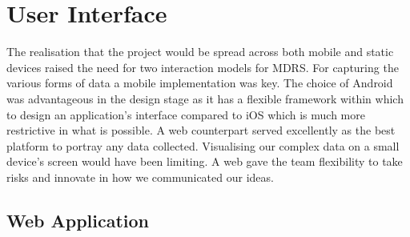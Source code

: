 \documentclass{l3proj}
\begin{document}
\section{User Interface} The realisation that the project would be spread across
both mobile and static devices raised the need for two interaction models for
MDRS. For capturing the various forms of data a mobile implementation was key. The choice of Android was advantageous in the design stage as it has a flexible framework within which to design an application's interface compared to iOS which is much more restrictive in what is possible. A web counterpart served excellently as the best platform to portray any data collected. Visualising our complex data on a small device's screen would have been limiting. A web gave the team flexibility to take risks and innovate in how we communicated our ideas.

\subsection{Web Application}


\end{document}
